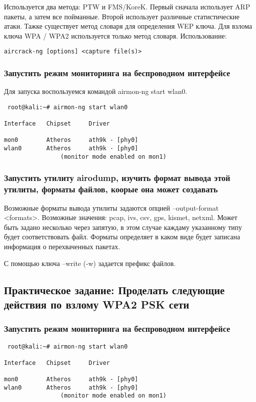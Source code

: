 \documentclass[10pt,a4paper,titlepage]{article}
\begin{document}
Используется два метода: PTW и FMS/KoreK. Первый сначала использует ARP пакеты, а затем все пойманные. Второй использует различные статистические атаки. Тажке существует метод словаря для определения WEP ключа. Для взлома ключа WPA / WPA2 используется только метод словаря.
Использование: 
\begin{verbatim}
aircrack-ng [options] <capture file(s)>
\end{verbatim}

\subsubsection{Запустить режим мониторинга на беспроводном интерфейсе}
Для запуска воспользуемся командой airmon-ng start wlan0.
\begin{verbatim}
 root@kali:~# airmon-ng start wlan0

Interface	Chipset		Driver

mon0		Atheros 	ath9k - [phy0]
wlan0		Atheros 	ath9k - [phy0]
				(monitor mode enabled on mon1)
\end{verbatim}
\subsubsection{Запустить утилиту airodump, изучить формат вывода этой утилиты, форматы файлов, коорые она может создавать}
Возможные форматы вывода утилиты задаются опцией  --output-format <formats>. Возможные значения: pcap, ivs, csv, gps, kismet, netxml. Может быть задано несколько через запятую, в этом случае каждаму указанному типу будет соответствовать файл. Форматы определяет в каком виде будет записана информация о перехваченных пакетах.

С помощью ключа --write (-w) задается префикс файлов.

\subsection{Практическое задание: Проделать следующие действия по взлому WPA2 PSK сети}

\subsubsection{Запустить режим мониторинга на беспроводном интерфейсе}
\begin{verbatim}
 root@kali:~# airmon-ng start wlan0

Interface	Chipset		Driver

mon0		Atheros 	ath9k - [phy0]
wlan0		Atheros 	ath9k - [phy0]
				(monitor mode enabled on mon1)
\end{verbatim}
\end{document}

